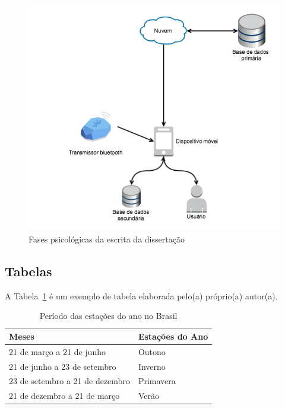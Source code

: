 \documentclass[twoside,english,brazilian]{UNISINOSmonografia}
\begin{document}
\begin{figure}
	\caption{Fases psicológicas da escrita da dissertação}
	\label{fig:escrita}
	\centering%
	\begin{minipage}{.8\textwidth}
		\includegraphics[width=\textwidth]{escrita}
	\end{minipage}
\end{figure}

\subsection{Tabelas}
A Tabela~\ref{tab:estacoes} é um exemplo de tabela elaborada pelo(a) próprio(a) autor(a).

\begin{table}
	\caption{Período das estações do ano no Brasil}
	\label{tab:estacoes}
	\centering%
	\begin{minipage}{.6\textwidth}
		\begin{tabular*}{\textwidth}{ll}
			\hline
			\textbf{Meses} & \textbf{Estações do Ano}\\
			\hline
			21 de março a 21 de junho & Outono\\
			21 de junho a 23 de setembro & Inverno\\
			23 de setembro a 21 de dezembro & Primavera\\
			21 de dezembro a 21 de março & Verão\\
			\hline
		\end{tabular*}
	\end{minipage}
\end{table}
\end{document}
